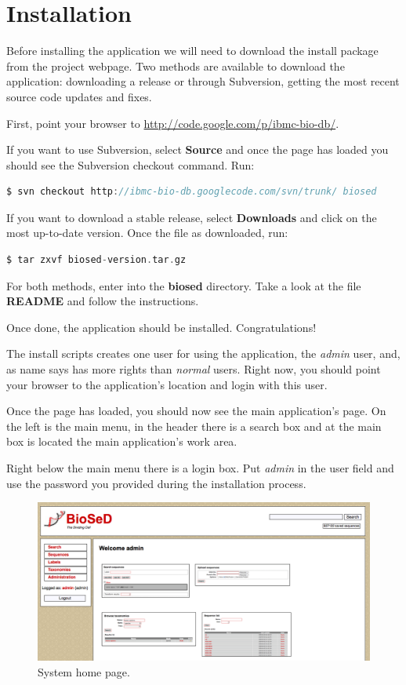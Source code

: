 
\section{Installation}

Before installing the application we will need to download the install package from the project
webpage. Two methods are available to download the application: downloading a release or
through Subversion, getting the most recent source code updates and fixes.

First, point your browser to \url{http://code.google.com/p/ibmc-bio-db/}.

If you want to use Subversion, select \textbf{Source} and once the page has loaded
you should see the Subversion checkout command. Run:

\begin{lstlisting}[language=c, frame=single]
$ svn checkout http://ibmc-bio-db.googlecode.com/svn/trunk/ biosed
\end{lstlisting}

If you want to download a stable release, select \textbf{Downloads} and click on the most up-to-date
version. Once the file as downloaded, run:

\begin{lstlisting}[language=c, frame=single]
$ tar zxvf biosed-version.tar.gz
\end{lstlisting}

For both methods, enter into the \textbf{biosed} directory. Take a look at the file \textbf{README}
and follow the instructions.

Once done, the application should be installed. Congratulations!

The install scripts creates one user for using the application, the \textit{admin} user, and, as name
says has more rights than \textit{normal} users.
Right now, you should point your browser to the application's location and login with this user.

Once the page has loaded, you should now see the main application's page.
On the left is the main menu, in the header there is a search box and at the main box is located
the main application's work area.

Right below the main menu there is a login box. Put \textit{admin} in the user field and
use the password you provided during the installation process.

\begin{figure}[H]
  \centering
    \includegraphics[scale=0.4]{interface.png}
  \caption{System home page.}
  \label{fig:home_page2}
\end{figure}


